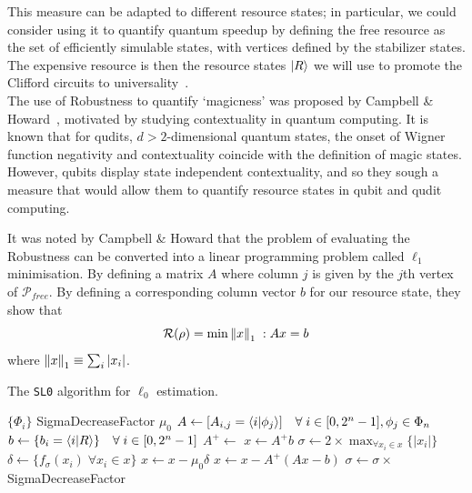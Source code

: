 \documentclass{standalone}
\begin{document}
This measure can be adapted to different resource states; in particular, we could consider using it to quantify quantum speedup by defining the free resource as the set of efficiently simulable states, with vertices defined by the stabilizer states. The expensive resource is then the resource states $\ket{R}$ we will use to promote the Clifford circuits to universality~\cite{Howard2016}.\\
The use of Robustness to quantify `magicness' was proposed by Campbell \& Howard~\cite{Howard2016}, motivated by studying contextuality in quantum computing. It is known that for qudits, $d>2$-dimensional quantum states, the onset of Wigner function negativity and contextuality coincide with the definition of magic states. However, qubits display state independent contextuality, and so they sough a measure that would allow them to quantify resource states in qubit and qudit computing. 
\par
It was noted by Campbell \& Howard that the problem of evaluating the Robustness can be converted into a linear programming problem called $\ell_{1}$ minimisation. By defining a matrix $A$ where column $j$ is given by the $j$th vertex of $\mathcal{P}_{free}$. By defining a corresponding column vector $b$ for our resource state, they show that~\cite{Howard2016}
\begin{equation}
    \mathcal{R}(\rho)=\min \norm{x}_{1}\; : Ax=b
\end{equation}
where $\norm{x}_{1}\equiv\sum_{i}\vert x_{i}\vert$.
\par
\begin{algorithm}[t]
\caption{The \texttt{SL0} algorithm for $\ell_{0}$ estimation.}
\label{alg:sl0}
\begin{algorithmic}
\Require $\{\Phi_{i}\}$ 
\Require SigmaDecreaseFactor 
\Require $\mu_{0}$ 
\Require {} 
 
    \State $A\leftarrow [A_{i,j}= \braket{i}{\phi_{j}}] \quad \forall\;i\in[0,2^{n}-1], \phi_{j}\in\Phi_{n}$
    \State $b \leftarrow \{b_{i}=\braket{i}{R}\} \quad \forall\;i\in[0,2^{n}-1]$
    \State $A^{+}\leftarrow $ 
    \State $x \leftarrow A^{+}b$
    \State $\sigma\leftarrow 2\times \max_{\forall x_{i}\in x} \{\vert x_{i} \vert\}$
            \State $\delta \leftarrow \{f_{\sigma}(x_{i})\;\forall x_{i}\in x\}$
            \State $x\leftarrow x-\mu_{0}\delta$ 
            \State $x \leftarrow x- A^{+}\left(Ax-b\right)$ 
        \EndFor
        \State $\sigma\leftarrow\sigma \times $SigmaDecreaseFactor
    \EndWhile
    \State \Return {}
\EndFunction
\end{algorithmic}
\end{algorithm}
\end{document}
